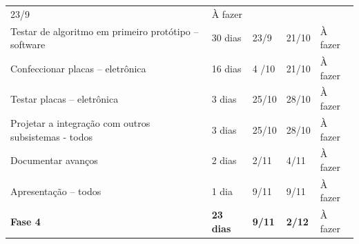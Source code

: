 \begin{table}[!htbp]
{\begin{tabular}{ l l l l l }
    \multicolumn{1}{p{1.550cm}|}{23/9} &
    \multicolumn{1}{p{2.000cm}|}{À fazer}
  \\  
  \cline{1-1}\cline{2-2}\cline{3-3}\cline{4-4}\cline{5-5}  
    \multicolumn{1}{|p{6.900cm}|}{Testar de algoritmo em primeiro protótipo – software} &
    \multicolumn{1}{p{1.817cm}|}{30 dias} &
    \multicolumn{1}{p{1.650cm}|}{23/9} &
    \multicolumn{1}{p{1.550cm}|}{21/10} &
    \multicolumn{1}{p{2.000cm}|}{À fazer}
  \\  
  \cline{1-1}\cline{2-2}\cline{3-3}\cline{4-4}\cline{5-5}  
    \multicolumn{1}{|p{6.900cm}|}{Confeccionar placas – eletrônica} &
    \multicolumn{1}{p{1.817cm}|}{16 dias} &
    \multicolumn{1}{p{1.650cm}|}{4 /10} &
    \multicolumn{1}{p{1.550cm}|}{21/10} &
    \multicolumn{1}{p{2.000cm}|}{À fazer}
  \\  
  \cline{1-1}\cline{2-2}\cline{3-3}\cline{4-4}\cline{5-5}  
    \multicolumn{1}{|p{6.900cm}|}{Testar placas – eletrônica} &
    \multicolumn{1}{p{1.817cm}|}{3 dias} &
    \multicolumn{1}{p{1.650cm}|}{25/10} &
    \multicolumn{1}{p{1.550cm}|}{28/10} &
    \multicolumn{1}{p{2.000cm}|}{À fazer}
  \\  
  \cline{1-1}\cline{2-2}\cline{3-3}\cline{4-4}\cline{5-5}  
    \multicolumn{1}{|p{6.900cm}|}{Projetar a integração com outros subsistemas - todos} &
    \multicolumn{1}{p{1.817cm}|}{3 dias} &
    \multicolumn{1}{p{1.650cm}|}{25/10} &
    \multicolumn{1}{p{1.550cm}|}{28/10} &
    \multicolumn{1}{p{2.000cm}|}{À fazer}
  \\  
  \cline{1-1}\cline{2-2}\cline{3-3}\cline{4-4}\cline{5-5}  
    \multicolumn{1}{|p{6.900cm}|}{Documentar avanços} &
    \multicolumn{1}{p{1.817cm}|}{2 dias} &
    \multicolumn{1}{p{1.650cm}|}{2/11} &
    \multicolumn{1}{p{1.550cm}|}{4/11} &
    \multicolumn{1}{p{2.000cm}|}{À fazer}
  \\  
  \cline{1-1}\cline{2-2}\cline{3-3}\cline{4-4}\cline{5-5}  
    \multicolumn{1}{|p{6.900cm}|}{Apresentação – todos} &
    \multicolumn{1}{p{1.817cm}|}{1 dia} &
    \multicolumn{1}{p{1.650cm}|}{9/11} &
    \multicolumn{1}{p{1.550cm}|}{9/11} &
    \multicolumn{1}{p{2.000cm}|}{À fazer}
  \\  
  \cline{1-1}\cline{2-2}\cline{3-3}\cline{4-4}\cline{5-5}  
    \multicolumn{1}{|p{6.900cm}|}{\textbf{Fase 4}} &
    \multicolumn{1}{p{1.817cm}|}{\textbf{23 dias}} &
    \multicolumn{1}{p{1.650cm}|}{\textbf{9/11}} &
    \multicolumn{1}{p{1.550cm}|}{\textbf{2/12}} &
    \multicolumn{1}{p{2.000cm}|}{À fazer}
  \\  
  \cline{1-1}\cline{2-2}\cline{3-3}\cline{4-4}\cline{5-5}  

\end{tabular}}
\end{table}
